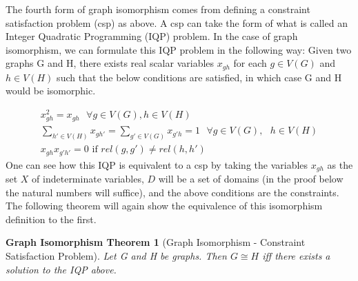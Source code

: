 \documentclass[12pt]{article}
\newtheorem{GraphIsomorphism}{Graph Isomorphism Theorem}
\theoremstyle{definition}
\begin{document}
The fourth form of graph isomorphism comes from defining a constraint satisfaction problem (csp) as above. A csp can take the form of what is called an Integer Quadratic Programming (IQP) problem. In the case of graph isomorphism, we can formulate this IQP problem in the following way: Given two graphs G and H, there exists real scalar variables $x_{gh}$ for each $g \in V(G)$ and $h \in V(H)$ such that the below conditions are satisfied, in which case G and H would be isomorphic. 

\begin{subequations}
\label{IQP}
\begin{align}
x_{gh}^2 = x_{gh} \text{  } \forall g \in V(G), h \in V(H)
\\
\sum_{h' \in V(H)} x_{gh'} = \sum_{g' \in V(G)} x_{g'h} = 1 \text{  } \forall g \in V(G), \text{  } h \in V(H)
\\
x_{gh}x_{g'h'} = 0 \text{ if } rel(g, g') \neq rel(h, h')
\end{align}
\end{subequations}
One can see how this IQP is equivalent to a csp by taking the variables $x_{gh}$ as the set $X$ of indeterminate variables, $D$ will be a set of domains (in the proof below the natural numbers will suffice), and the above conditions are the constraints. The following theorem will again show the equivalence of this isomorphism definition to the first.

\begin{GraphIsomorphism}[Graph Isomorphism - Constraint Satisfaction Problem]
Let G and H be graphs. Then $G \cong H$ iff there exists a solution to the IQP above.
\end{GraphIsomorphism}
\end{document}
